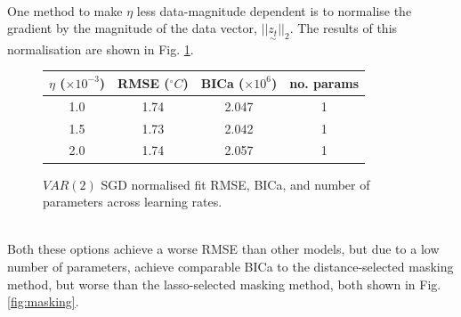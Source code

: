 \documentclass[12pt,a4paper]{article} %
\newcommand{\ve}[1]{\underset{\sim}{#1}}
\begin{document}
\\
One method to make $\eta$ less data-magnitude dependent is to normalise the gradient by the magnitude of the data vector, $||\ve{z_t}||_2$. The results of this normalisation are shown in Fig. \ref{fig:sgd_norm_table}.
\begin{figure}[!ht]
    \centering
    \begin{tabular}{|c|c|c|c|}
        \hline
        $\eta$ ($\times10^{-3}$) & RMSE ($^\circ C$) & BICa ($\times10^6$) & no. params \\
        \hline
        1.0 & 1.74 & 2.047 & 1 \\
        \hline
        1.5 & 1.73 & 2.042 & 1 \\
        \hline
        2.0 & 1.74 & 2.057 & 1 \\
        \hline
    \end{tabular}
    \caption{$VAR(2)$ SGD normalised fit RMSE, BICa, and number of parameters across learning rates.}
    \label{fig:sgd_norm_table}
\end{figure}
\\
Both these options achieve a worse RMSE than other models, but due to a low number of parameters, achieve comparable BICa to the distance-selected masking method, but worse than the lasso-selected masking method, both shown in Fig. \ref{fig:masking}.
\end{document}
